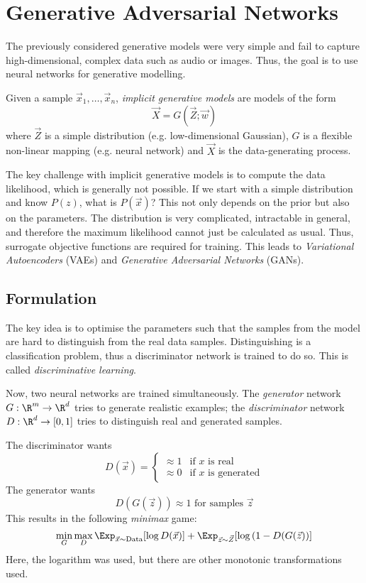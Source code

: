 \section{Generative Adversarial Networks}
The previously considered generative models
were very simple and fail to capture high-dimensional,
complex data such as audio or images.
Thus, the goal is to use neural networks
for generative modelling.

Given a sample $\vec{x}_1, \dotsc, \vec{x}_n$,
\emph{implicit generative models} are models
of the form
\begin{equation*}
    \vec{X} = G(\vec{Z}; \vec{w})
\end{equation*}
where $\vec{Z}$ is a simple distribution
(e.g. low-dimensional Gaussian),
$G$ is a flexible non-linear mapping
(e.g. neural network)
and $\vec{X}$ is the data-generating process.

The key challenge with implicit generative models
is to compute the data likelihood,
which is generally not possible.
If we start with a simple distribution
and know $P(z)$, what is $P(\vec{x})$?
This not only depends on the prior but
also on the parameters.
The distribution is very complicated,
intractable in general,
and therefore the maximum likelihood
cannot just be calculated as usual.
Thus, surrogate objective functions
are required for training.
This leads to
\emph{Variational Autoencoders} (VAEs)
and \emph{Generative Adversarial Networks} (GANs).

\subsection{Formulation}
The key idea is to optimise the parameters
such that the samples from the model are
hard to distinguish from the real data samples.
Distinguishing is a classification problem,
thus a discriminator network is trained to do so.
This is called \emph{discriminative learning}.

Now, two neural networks are trained simultaneously.
The \emph{generator} network $G : \R^m \to \R^d$
tries to generate realistic examples;
the \emph{discriminator} network
$D : \R^d \to [0, 1]$
tries to distinguish real and generated samples.

The discriminator wants
\begin{equation*}
    D(\vec{x}) =
    \begin{cases}
        \approx 1 & \text{if $x$ is real} \\
        \approx 0 & \text{if $x$ is generated}
    \end{cases}
\end{equation*}
The generator wants
\begin{equation*}
    D(G(\vec{z})) \approx 1 \text{ for samples $\vec{z}$}
\end{equation*}
This results in the following \emph{minimax} game:
\begin{equation*}
    \min_G{\max_D{
        \Exp_{\vec{x} \sim \text{Data}}[\log{D(\vec{x})}]
        +
        \Exp_{\vec{z} \sim \vec{Z}}[\log{(1 - D(G(\vec{z}))}]
    }}
\end{equation*}
Here, the logarithm was used,
but there are other monotonic
transformations used.


